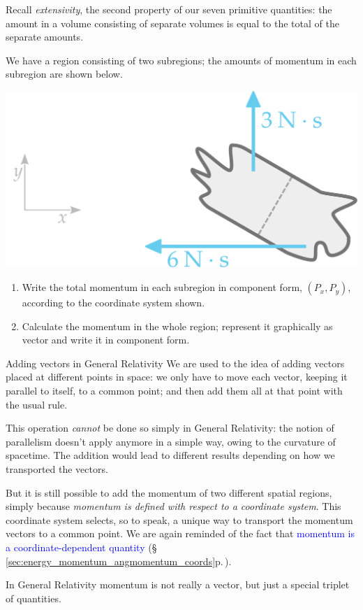 \documentclass[a4paper,12pt,%
onecolumn,oneside,%
british%
]{memoir}
\renewcommand*{\|}[1][]{\nonscript\:#1\vert\nonscript\:\mathopen{}}
\newcommand*{\sect}{\S}%
\renewcommand*{\autoref}[3][\sect\,\ref]{\textcolor{blue}{#3} {\color{blue}\scriptsize(\faIcon[regular]{eye}\;#1{#2}\;p.\,\pageref{#2})}}
\begin{document}
\bigskip


\begin{exercise}
  Recall \emph{extensivity}, the second property of our seven primitive quantities: the amount in a volume consisting of separate volumes is equal to the total of the separate amounts.

We have a region consisting of two subregions; the amounts of momentum in each subregion are shown below.
  \begin{center}
    \includegraphics[width=0.5\linewidth]{images/exercise_momentumsum.pdf}
  \end{center}
  \begin{enumerate}[exerc]
  \item Write the total momentum in each subregion in component form, $(P_{x}, P_{y})$, according to the coordinate system shown.
  \item Calculate the momentum in the whole region; represent it graphically as vector and write it in component form.
  \end{enumerate}
\end{exercise}

\begin{extra}{Adding vectors in General Relativity}
  We are used to the idea of adding vectors placed at different points in space: we only have to move each vector, keeping it parallel to itself, to a common point; and then add them all at that point with the usual rule.

  This operation \emph{cannot} be done so simply in General Relativity: the notion of parallelism doesn't apply anymore in a simple way, owing to the curvature of spacetime. The addition would lead to different results depending on how we transported the vectors.

  But it is still possible to add the momentum of two different spatial regions, simply because \emph{momentum is defined with respect to a coordinate system}. This coordinate system selects, so to speak, a unique way to transport the momentum vectors to a common point. We are again reminded of the fact that \autoref{sec:energy_momentum_angmomentum_coords}{momentum is a coordinate-dependent quantity}.

  In General Relativity momentum is not really a vector, but just a special triplet of quantities.

\end{extra}
\end{document}
